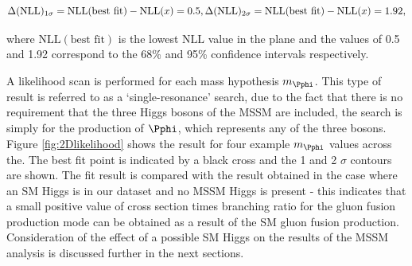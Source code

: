 \begin{equation}
\Delta(\mathrm{NLL})_{1\sigma} = \mathrm{NLL}(\text{best fit}) - \mathrm{NLL}(x) = 0.5 ,\\ 
\Delta(\mathrm{NLL})_{2\sigma} = \mathrm{NLL}(\text{best fit}) - \mathrm{NLL}(x) = 1.92 , 
\end{equation}

where $\mathrm{NLL}(\text{best fit})$ is the lowest $\mathrm{NLL}$ value in the plane and the
values of 0.5 and 1.92 correspond to the 68\% and 95\% confidence intervals
respectively.

A likelihood scan is performed for each mass hypothesis $m_{\Pphi}$. 
This type of result is referred to as a `single-resonance' search,
due to the fact that there is no requirement that the three Higgs bosons of the
\ac{MSSM} are included, the search is simply for the production of $\Pphi$,
which represents any of the three bosons. Figure \ref{fig:2Dlikelihood} shows the 
result for four example $m_{\Pphi}$ values across the. 
The best fit point is indicated by a black cross and the 1 and 2 $\sigma$
contours are shown. The fit result is compared with the result obtained in the
case where an \ac{SM} Higgs is in our dataset and no \ac{MSSM} Higgs is present
- this indicates that a small positive value of cross section times branching
ratio for the gluon fusion production mode can be obtained as a result of the
\ac{SM} gluon fusion production. Consideration of the effect of a possible
\ac{SM} Higgs on the results of the \ac{MSSM} analysis is discussed further in
the next sections.

